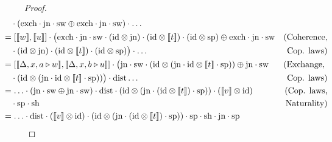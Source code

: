 \begin{proof}
\begin{align*}
  & \hspace{-20pt} \comp  ( \text{exch} \comp \text{jn}\comp \sw \oplus  \text{exch} \comp \text{jn} \comp \sw)   \comp \ldots  \\
  & \hspace{-30pt} =  \left[[\![w ]\!] ,[\![ u]\!] \right] \comp \big(\text{exch} \comp \text{jn} \comp \sw \comp (\id \otimes  \text{jn} ) \comp (\id \otimes [\![t]\!]) \comp  (\id \otimes \text{sp} ) \oplus \text{exch} \comp \text{jn} \comp \sw   & {(\text{Coherence},} \\
  & \hspace{-30pt} \hspace{10pt} \comp (\id \otimes  \text{jn} ) \comp (\id \otimes [\![t]\!]) \comp  (\id \otimes \text{sp} ) \big)\comp  \ldots & {\text{Cop. laws})} \\
  & \hspace{-30pt} = [[\![ \Delta  , x ,  a \vljud w]\!] , [\![ \Delta  , x ,  b \vljud u]\!]]  \comp \big(\text{jn} \comp \sw \comp (\id \otimes  (\text{jn} \comp \id \otimes [\![t]\!]  \comp \text{sp}))  \oplus \text{jn} \comp  \sw      & {(\text{Exchange, }}  \\
  & \hspace{-30pt} \hspace{10pt} \comp (\id \otimes  (\text{jn} \comp \id \otimes [\![t]\!] \comp \text{sp}) )\big) \comp \dist \ldots  & { \text{Cop. laws})}\\
  & \hspace{-30pt} = \ldots \comp  (\text{jn} \comp \sw \oplus \text{jn} \comp \sw)  \comp \dist \comp ( \id \otimes (\text{jn} \cdot (\id \otimes [\![t]\!]) \cdot \text{sp} ) ) \comp ([\![v]\!] \otimes \id)  & {(\text{Cop. laws,}}  \\
  & \hspace{-20pt} \comp \text{sp} \comp \text{sh} & {\text{Naturality})} \\
  & \hspace{-30pt} =  \ldots \comp \dist \comp  ([\![v]\!] \otimes \id)  \comp ( \id \otimes (\text{jn} \comp  (\id \otimes [\![t]\!]) \cdot \text{sp} ) ) \comp \text{sp}\comp \text{sh} \comp \text{jn}  \comp \text{sp}    & \\

\end{align*}
\end{proof}
